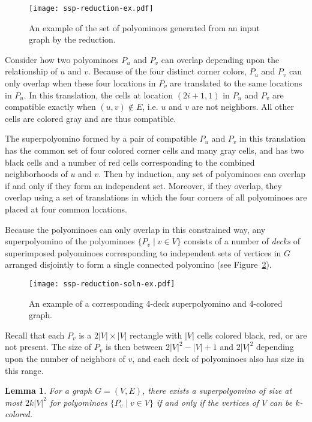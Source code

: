 \documentclass{article}
\newtheorem{lemma}[theorem]{Lemma}
\begin{document}
\begin{figure}[ht]
\centering
\texttt{[image: ssp-reduction-ex.pdf]}
\caption{An example of the set of polyominoes generated from an input graph by the reduction.}
\label{fig:reduction-ex}
\end{figure}

Consider how two polyominoes $P_u$ and $P_v$ can overlap depending upon the relationship of $u$ and $v$.
Because of the four distinct corner colors, $P_u$ and $P_v$ can only overlap when these four locations in $P_v$ are translated to the same locations in $P_u$.
In this translation, the cells at location $(2i+1, 1)$ in $P_u$ and $P_v$ are compatible exactly when $(u, v) \not\in E$, i.e. $u$ and $v$ are not neighbors. 
All other cells are colored gray and are thus compatible.

The superpolyomino formed by a pair of compatible $P_u$ and $P_v$ in this translation has the common set of four colored corner cells and many gray cells, and has two black cells and a number of red cells corresponding to the combined neighborhoods of $u$ and $v$.
Then by induction, any set of polyominoes can overlap if and only if they form an independent set.
Moreover, if they overlap, they overlap using a set of translations in which the four corners of all polyominoes are placed at four common locations. 

Because the polyominoes can only overlap in this constrained way, any superpolyomino of the polyominoes $\{P_v \mid v \in V\}$ consists of a number of \emph{decks} of superimposed polyominoes corresponding to independent sets of vertices in $G$ arranged disjointly to form a single connected polyomino (see Figure~\ref{fig:reduction-soln-ex}). 

\begin{figure}[ht]
\centering
\texttt{[image: ssp-reduction-soln-ex.pdf]}
\caption{An example of a corresponding 4-deck superpolyomino and 4-colored graph.}
\label{fig:reduction-soln-ex}
\end{figure}

Recall that each $P_v$ is a $2|V| \times |V|$ rectangle with $|V|$ cells colored black, red, or are not present.
The size of $P_v$ is then between $2|V|^2 - |V| + 1$ and $2|V|^2$ depending upon the number of neighbors of $v$, and each deck of polyominoes also has size in this range.

\begin{lemma}
\label{lem:deck-to-coloring}
For a graph $G = (V, E)$, there exists a superpolyomino of size at most $2k|V|^2$ for polyominoes $\{P_v \mid v \in V\}$ if and only if the vertices of $V$ can be $k$-colored.
\end{lemma}
\end{document}
